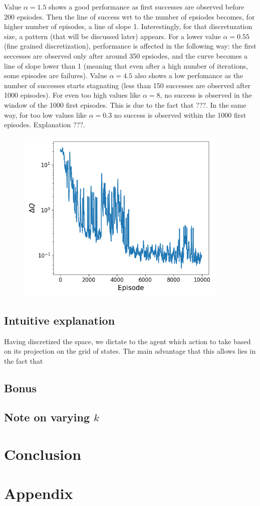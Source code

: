 \documentclass[a4paper, 12pt,oneside]{article}
\begin{document}
        Value $\alpha=1.5$ shows a good performance as first successes are observed before 200 epsiodes. Then the line of success wrt to the number of epsiodes becomes, for higher number of episodes, a line of slope 1. Interestingly, for that discretuzation size, a pattern (that will be discussed later) appears. For a lower value $\alpha=0.55$ (fine grained discretization), performance is affected in the following way: the first seccesses are observed only after around 350 epsiodes, and the curve becomes a line of slope lower than 1 (meaning that even after a high number of iterations, some episodes are failures). 
        Value $\alpha=4.5$ also shows a low perfomance as the number of successes starts stagnating (less than 150 successes are observed after 1000 episodes). 
        For even too high values like $\alpha=8$, no success is observed in the window of the 1000 first episodes. This is due to the fact that ???.
        In the same way, for too low values like $\alpha=0.3$ no success is observed within the 1000 first episodes. Explanation ???. 
        \begin{figure}[h]
            \includegraphics[width=0.9\textwidth]{../runs/dyna/dyna-k=3-ss_coef=1.5/figs/log_Q_value_changes.png}
             \caption{ }
       \end{figure}

    

        \subsection{Intuitive explanation}
        Having discretized the space, we dictate to the agent which action to take based on its projection on the grid of states. 
        The main advantage that this allows lies in the fact that 

        \subsection{Bonus}
        \subsection{Note on varying $k$}
        \section{Conclusion}

        \section{Appendix}
\end{document}
